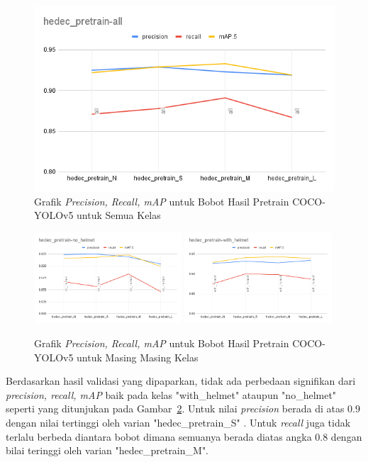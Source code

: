 \begin{figure} [h!]
  \centering
  \includegraphics[width=1\textwidth]{gambar/final_weight_val/hedec_pretrain-all.png}
  \caption{Grafik \emph{Precision, Recall, mAP} untuk Bobot Hasil Pretrain COCO-YOLOv5 untuk Semua Kelas}
  \label{fig:grafval_pretrain_all}  
\end{figure}

\begin{figure} [h!]
  \centering
  \includegraphics[width=0.49\textwidth]{gambar/final_weight_val/hedec_pretrain-no_helmet.png}
  \includegraphics[width=0.49\textwidth]{gambar/final_weight_val/hedec_pretrain-with_helmet.png}
  \caption{Grafik \emph{Precision, Recall, mAP} untuk Bobot Hasil Pretrain COCO-YOLOv5 untuk Masing Masing Kelas}
  \label{fig:grafval_pretrain_eachclass}  
\end{figure}


\par Berdasarkan hasil validasi yang dipaparkan, tidak ada perbedaan signifikan dari \emph{precision, recall, mAP} 
baik pada kelas "with\_helmet" ataupun "no\_helmet" seperti yang ditunjukan pada Gambar~\ref{fig:grafval_pretrain_eachclass}.
Untuk nilai \emph{precision} berada di atas 0.9 dengan nilai tertinggi oleh varian "hedec\_pretrain\_S" . Untuk \emph{recall}
juga tidak terlalu berbeda diantara bobot dimana semuanya berada diatas angka 0.8 dengan bilai teringgi 
oleh varian "hedec\_pretrain\_M". 

